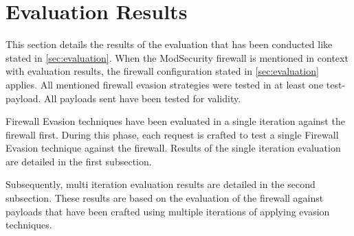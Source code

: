 \section{Evaluation Results}
\label{sec:EvaluationResults}
This section details the results of the evaluation that has been conducted like stated in \ref{sec:evaluation}. 
When the ModSecurity firewall is mentioned in context with evaluation results, the firewall configuration stated in \ref{sec:evaluation} applies. 
All mentioned firewall evasion strategies were tested in at least one test-payload.
All payloads sent have been tested for validity.

Firewall Evasion techniques have been evaluated in a single iteration against the firewall first. During this phase, each request is crafted to test a single Firewall Evasion technique against the firewall. Results of the single iteration evaluation are detailed in the first subsection. 

Subsequently, multi iteration evaluation results are detailed in the second subsection. These results are based on the evaluation of the firewall against payloads that have been crafted using multiple iterations of applying evasion techniques.

%

